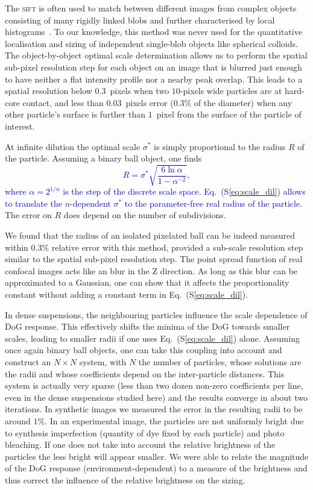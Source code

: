 \documentclass[prl,twocolumn,notitlepage]{revtex4-1}
\begin{document}
The \textsc{sift} is often used to match between different images from complex objects consisting of many rigidly linked blobs and further characterised by local histograms~\citep{Lowe2004}. To our knowledge, this method was never used for the quantitative localisation and sizing of independent single-blob objects like spherical colloids. The object-by-object optimal scale determination allows us to perform the spatial sub-pixel resolution step for each object on an image that is blurred just enough to have neither a flat intensity profile nor a nearby peak overlap. This leads to a spatial resolution below $0.3$~pixels when two $10$-pixels wide particles are at hard-core contact, and less than $0.03$~pixels error ($0.3\%$ of the diameter) when any other particle's surface is further than $1$~pixel from the surface of the particle of interest.

At infinite dilution the optimal scale $\sigma^*$ is simply proportional to the radius $R$ of the particle. Assuming a binary ball object, one finds\textcolor{blue}{
\begin{equation}
	R = \sigma^* \sqrt{\frac{6\ln \alpha}{1-\alpha^{-2}}}, 
	\label{eq:scale_dil}
\end{equation}
where $\alpha = 2^{1/n}$ is the step of the discrete scale space. Eq.~(S\ref{eq:scale_dil}) allows to translate the $n$-dependent $\sigma^*$ to the parameter-free real radius of the particle.} The error on $R$ does depend on the number of subdivisions.

We found that the radius of an isolated pixelated ball can be indeed measured within $0.3\%$ relative error with this method, provided a sub-scale resolution step similar to the spatial sub-pixel resolution step. The point spread function of real confocal images acts like an blur in the Z direction. As long as this blur can be approximated to a Gaussian, one can show that it affects the proportionality constant without adding a constant term in Eq.~(S\ref{eq:scale_dil}).

In dense suspensions, the neighbouring particles influence the scale dependence of DoG response. This effectively shifts the minima of the DoG towards smaller scales, leading to smaller radii if one uses Eq.~(S\ref{eq:scale_dil}) alone. Assuming once again binary ball objects, one can take this coupling into account and construct an $N\times N$ system, with $N$ the number of particles, whose solutions are the radii and whose coefficients depend on the inter-particle distances. This system is actually very sparse (less than two dozen non-zero coefficients per line, even in the dense suspensions studied here) and the results converge in about two iterations. In synthetic images we measured the error in the resulting radii to be around $1\%$. In an experimental image, the particles are not uniformly bright due to synthesis imperfection (quantity of dye fixed by each particle) and photo bleaching. If one does not take into account the relative brightness of the particles the less bright will appear smaller. We were able to relate the magnitude of the DoG response (environment-dependent) to a measure of the brightness and thus correct the influence of the relative brightness on the sizing.
\end{document}
